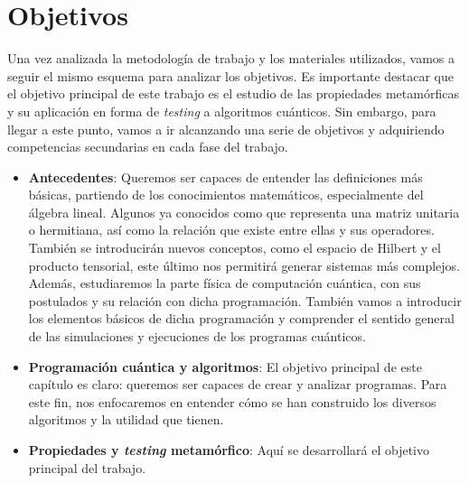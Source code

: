 \section{Objetivos}
\label{Sec1.2:Objetivos}

Una vez analizada la metodología de trabajo y los materiales utilizados, vamos a seguir el mismo esquema para analizar los objetivos. Es importante destacar que el objetivo principal de este trabajo es el estudio de las propiedades metamórficas y su aplicación en forma de \textit{testing} a algoritmos cuánticos. Sin embargo, para llegar a este punto, vamos a ir alcanzando una serie de objetivos y adquiriendo competencias secundarias en cada fase del trabajo. 

\begin{itemize}
    \item \textbf{Antecedentes}: Queremos ser capaces de entender las definiciones más básicas, partiendo de los conocimientos matemáticos, especialmente del álgebra lineal. Algunos ya conocidos como que representa una matriz unitaria o hermitiana, así como la relación que existe entre ellas y sus operadores. También se introducirán nuevos conceptos, como el espacio de Hilbert y el producto tensorial, este último nos permitirá generar sistemas más complejos. Además, estudiaremos la parte física de computación cuántica, con sus postulados y su relación con dicha programación. También vamos a  introducir los elementos básicos de dicha programación y comprender el sentido general de las simulaciones y ejecuciones de los programas cuánticos.
    
    \item \textbf{Programación cuántica y algoritmos}: El objetivo principal de este capítulo es claro: queremos ser capaces de crear y analizar programas. Para este fin, nos enfocaremos en entender cómo se han construido los diversos algoritmos y la utilidad que tienen.

    \item \textbf{Propiedades y \textit{testing} metamórfico}: Aquí se desarrollará el objetivo principal del trabajo.
\end{itemize}

\vspace{1cm}